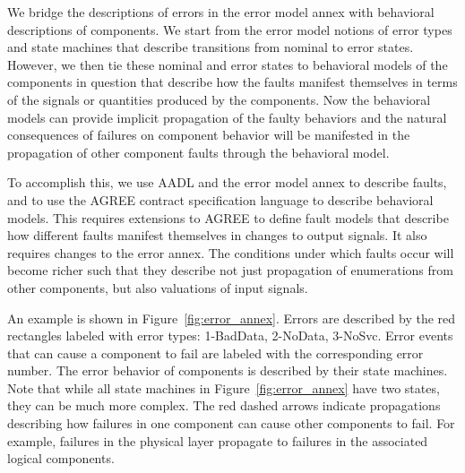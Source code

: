 We bridge the descriptions of errors in the error model annex with behavioral descriptions of components. We start from the error model notions of error types and state machines that describe transitions from nominal to error states. However, we then tie these nominal and error states to behavioral models of the components in question that describe how the faults manifest themselves in terms of the signals or quantities produced by the components. Now the behavioral models can provide implicit propagation of the faulty behaviors and the natural consequences of failures on component behavior will be manifested in the propagation of other component faults through the behavioral model.

To accomplish this, we use AADL and the error model annex to describe faults, and to use the AGREE contract specification language to describe behavioral models. This requires extensions to AGREE to define fault models that describe how different faults manifest themselves in changes to output signals. It also requires changes to the error annex. The conditions under which faults occur will become richer such that they describe not just propagation of enumerations from other components, but also valuations of input signals.

An example is shown in Figure~\ref{fig:error_annex}. Errors are described by the red rectangles labeled with error types: 1-BadData, 2-NoData, 3-NoSvc. Error events that can cause a component to fail are labeled with the corresponding error number. The error behavior of components is described by their state machines. Note that while all state machines in Figure~\ref{fig:error_annex} have two states, they can be much more complex. The red dashed arrows indicate propagations describing how failures in one component can cause other components to fail. For example, failures in the physical layer propagate to failures in the associated logical components.





